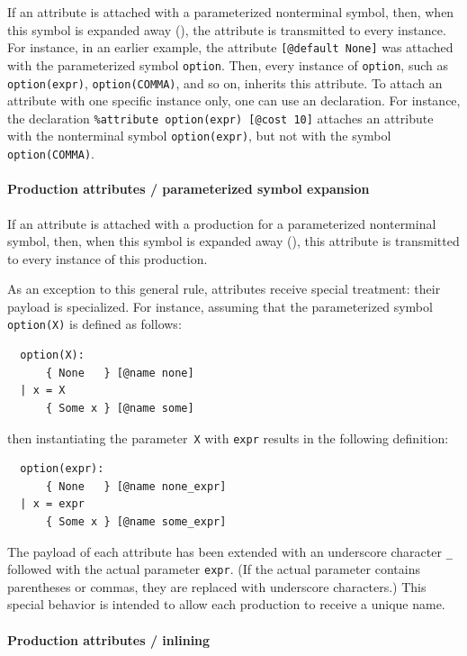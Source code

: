 \documentclass[onecolumn,11pt,nocopyrightspace,preprint]{sigplanconf}
\begin{document}
If an attribute is attached with a parameterized nonterminal symbol, then,
when this symbol is expanded away (),
the attribute is transmitted to every
instance. For instance, in an earlier example, the attribute
\verb+[@default None]+ was attached with the parameterized symbol
\verb+option+. Then, every instance of \verb+option+, such as
\verb+option(expr)+, \verb+option(COMMA)+, and so on, inherits this
attribute. To attach an attribute with one specific
instance only, one can use an \dattribute declaration. For instance,
the declaration \verb+%attribute option(expr) [@cost 10]+ attaches
an attribute with the nonterminal symbol \verb+option(expr)+, but
not with the symbol \verb+option(COMMA)+.

\paragraph{Production attributes / parameterized symbol expansion}

If an attribute is attached with a production for a parameterized nonterminal
symbol, then, when this symbol is expanded away (), this
attribute is transmitted to every instance of this production.

As an exception to this general rule, \dname attributes receive
special treatment: their payload is specialized. For instance, assuming that
the parameterized symbol \verb+option(X)+ is defined as follows:
%
\begin{verbatim}
  option(X):
      { None   } [@name none]
  | x = X
      { Some x } [@name some]
\end{verbatim}
%
then instantiating the parameter~\verb+X+ with \verb+expr+ results in the
following definition:
%
\begin{verbatim}
  option(expr):
      { None   } [@name none_expr]
  | x = expr
      { Some x } [@name some_expr]
\end{verbatim}
%
The payload of each \dname attribute has been extended with
an underscore character \verb+_+ followed with the actual
parameter \verb+expr+.
%
(If the actual parameter contains parentheses or commas,
they are replaced with underscore characters.)
%
This special behavior is intended to allow each production
to receive a unique name.

\paragraph{Production attributes / inlining}
\end{document}

